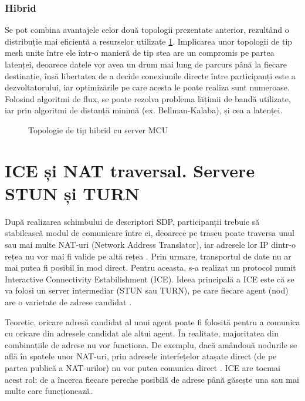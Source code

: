 \subsubsection{Hibrid}
\indent \par Se pot combina avantajele celor două topologii prezentate anterior, rezultând o distribuție mai eficientă a resurselor utilizate \ref{WebRTCHybrid}. Implicarea unor topologii de tip mesh unite între ele într-o manieră de tip stea are un compromis pe partea latenței, deoarece datele vor avea un drum mai lung de parcurs până la fiecare destinație, însă libertatea de a decide conexiunile directe între participanți este a dezvoltatorului, iar optimizările pe care acesta le poate realiza sunt numeroase. Folosind algoritmi de flux, se poate rezolva problema lățimii de bandă utilizate, iar prin algoritmi de distanță minimă (ex. Bellman-Kalaba), și cea a latenței.
\begin{figure}[H]
    \centering
    \scalebox{0.65}{}
    \caption{Topologie de tip hibrid cu server MCU}
    \label{WebRTCHybrid}
\end{figure}

\section{ICE și NAT traversal. Servere STUN și TURN}
\label{sec:ch3sec2}
\indent \par După realizarea schimbului de descriptori SDP, participanții trebuie să stabilească modul de comunicare între ei, deoarece pe traseu poate traversa unul sau mai multe NAT-uri (Network Address Translator), iar adresele lor IP dintr-o rețea nu vor mai fi valide pe altă rețea \cite{rfc8445}. Prin urmare, transportul de date nu ar mai putea fi posibil în mod direct. Pentru aceasta, s-a realizat un protocol numit Interactive Connectivity Estabilishment (ICE). Ideea principală a ICE este că se va folosi un server intermediar (STUN sau TURN), pe care fiecare agent (nod) are o varietate de adrese candidat \cite{rfc8445}.
\indent \par Teoretic, oricare adresă candidat al unui agent poate fi folosită pentru a comunica cu oricare din adresele candidat ale altui agent. În realitate, majoritatea din combinațiile de adrese nu vor funcționa. De exemplu, dacă amândouă nodurile se află în spatele unor NAT-uri, prin adresele interfețelor atașate direct (de pe partea publică a NAT-urilor) nu vor putea comunica direct \cite{rfc8445}. ICE are tocmai acest rol: de a încerca fiecare pereche posibilă de adrese până găsește una sau mai multe care funcționează.
